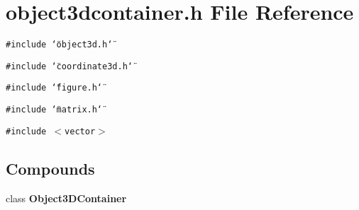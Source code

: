 \section{object3dcontainer.h File Reference}
\label{object3dcontainer_8h}
{\tt \#include \char`\"{}object3d.h\char`\"{}}\par
{\tt \#include \char`\"{}coordinate3d.h\char`\"{}}\par
{\tt \#include \char`\"{}figure.h\char`\"{}}\par
{\tt \#include \char`\"{}matrix.h\char`\"{}}\par
{\tt \#include $<$vector$>$}\par
\subsection*{Compounds}
\begin{CompactItemize}
\item 
class {\bf Object3DContainer}
\end{CompactItemize}
